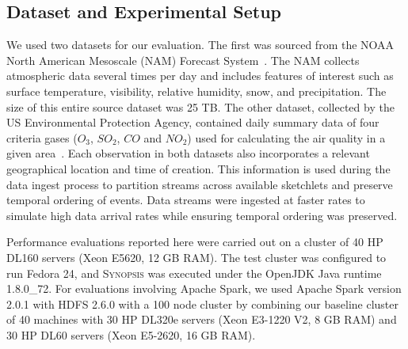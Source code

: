 \documentclass[9pt,journal,compsoc]{IEEEtran}
\begin{document}
\subsection{Dataset and Experimental Setup}
We used two datasets for our evaluation.
The first was sourced from the NOAA North American Mesoscale (NAM) Forecast System~\cite{noaa_nam}.  The NAM collects atmospheric data several times per day and includes features of interest such as surface temperature, visibility, relative humidity, snow, and precipitation. The size of this entire source dataset was 25 TB.
The other dataset, collected by the US Environmental Protection Agency, contained daily summary data of four criteria gases ($O_3$, $SO_2$, $CO$ and $NO_2$) used for calculating the air quality in a given area~\cite{epa-criteriagases}. Each observation in both datasets also incorporates a relevant geographical location and time of creation. This information is used during the data ingest process to partition streams across available sketchlets and preserve temporal ordering of events. Data streams were ingested at faster rates to simulate high data arrival rates while ensuring temporal ordering was preserved.

Performance evaluations reported here were carried out on a cluster of 40 HP DL160 servers (Xeon E5620, 12 GB RAM). The test cluster was configured to run Fedora 24, and \textsc{Synopsis} was executed under the OpenJDK Java runtime 1.8.0\_72.
For evaluations involving Apache Spark, we used Apache Spark version 2.0.1 with HDFS 2.6.0 with a 100 node cluster by combining our baseline cluster of 40 machines with 30 HP DL320e servers (Xeon E3-1220 V2, 8 GB RAM) and 30 HP DL60 servers (Xeon E5-2620, 16 GB RAM). 
\end{document}
